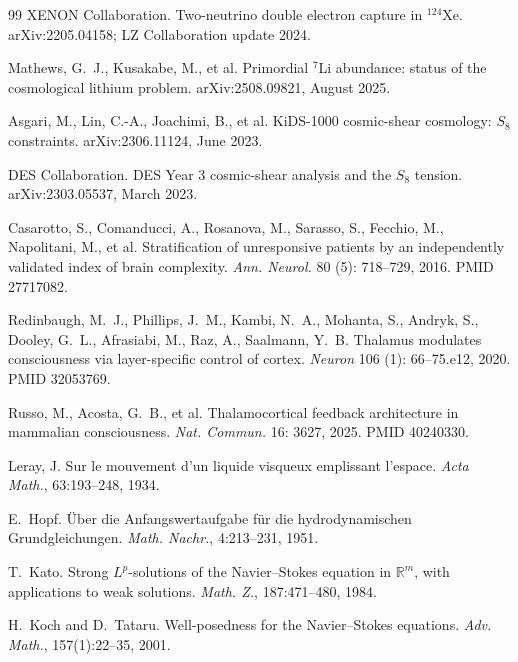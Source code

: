\documentclass[11pt,a4paper]{amsart}
\theoremstyle{plain}
\theoremstyle{definition}
\begin{document}
\begin{thebibliography}{99}
XENON Collaboration.
\newblock Two-neutrino double electron capture in ${}^{124}$Xe.
\newblock arXiv:2205.04158; LZ Collaboration update 2024.

Mathews, G.~J., Kusakabe, M., et al.
\newblock Primordial $^7$Li abundance: status of the cosmological lithium problem.
\newblock arXiv:2508.09821, August 2025.

Asgari, M., Lin, C.-A., Joachimi, B., et al.
\newblock KiDS-1000 cosmic-shear cosmology: $S_8$ constraints.
\newblock arXiv:2306.11124, June 2023.

DES Collaboration.
\newblock DES Year 3 cosmic-shear analysis and the $S_8$ tension.
\newblock arXiv:2303.05537, March 2023.

Casarotto, S., Comanducci, A., Rosanova, M., Sarasso, S., Fecchio, M., Napolitani, M., et al.
\newblock Stratification of unresponsive patients by an independently validated index of brain complexity.
\newblock \emph{Ann. Neurol.} 80 (5): 718--729, 2016. PMID 27717082.

Redinbaugh, M.~J., Phillips, J.~M., Kambi, N.~A., Mohanta, S., Andryk, S., Dooley, G.~L., Afrasiabi, M., Raz, A., Saalmann, Y.~B.
\newblock Thalamus modulates consciousness via layer-specific control of cortex.
\newblock \emph{Neuron} 106 (1): 66--75.e12, 2020. PMID 32053769.

Russo, M., Acosta, G.~B., et al.
\newblock Thalamocortical feedback architecture in mammalian consciousness.
\newblock \emph{Nat. Commun.} 16: 3627, 2025. PMID 40240330.

Leray, J.
\newblock Sur le mouvement d'un liquide visqueux emplissant l'espace.
\newblock \emph{Acta Math.}, 63:193--248, 1934.

E.~Hopf.
\newblock \"Uber die Anfangswertaufgabe f\"ur die hydrodynamischen Grundgleichungen.
\newblock \emph{Math. Nachr.}, 4:213--231, 1951.

T.~Kato.
\newblock Strong $L^p$-solutions of the Navier--Stokes equation in $\mathbb{R}^m$, with applications to weak solutions.
\newblock \emph{Math. Z.}, 187:471--480, 1984.

H.~Koch and D.~Tataru.
\newblock Well-posedness for the Navier--Stokes equations.
\newblock \emph{Adv. Math.}, 157(1):22--35, 2001.


\end{thebibliography}
\end{document}
